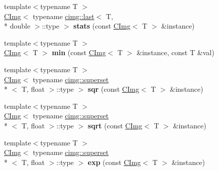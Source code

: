 \begin{DoxyCompactItemize}
\item 
\hypertarget{namespacecimg__library_a65ae500e6c92b0801d4dd80b67e54506}{{\footnotesize template$<$typename T $>$ }\\\hyperlink{structcimg__library_1_1_c_img}{C\-Img}$<$ typename \hyperlink{structcimg__library_1_1cimg_1_1last}{cimg\-::last}$<$ T, \\*
double $>$\-::type $>$ {\bfseries stats} (const \hyperlink{structcimg__library_1_1_c_img}{C\-Img}$<$ T $>$ \&instance)}\label{namespacecimg__library_a65ae500e6c92b0801d4dd80b67e54506}

\item 
\hypertarget{namespacecimg__library_a973eba583e34a30fcf9e64dcf905bcab}{{\footnotesize template$<$typename T $>$ }\\\hyperlink{structcimg__library_1_1_c_img}{C\-Img}$<$ T $>$ {\bfseries min} (const \hyperlink{structcimg__library_1_1_c_img}{C\-Img}$<$ T $>$ \&instance, const T \&val)}\label{namespacecimg__library_a973eba583e34a30fcf9e64dcf905bcab}

\item 
\hypertarget{namespacecimg__library_a1ee7db316304a174dc5390ca6ab98de3}{{\footnotesize template$<$typename T $>$ }\\\hyperlink{structcimg__library_1_1_c_img}{C\-Img}$<$ typename \hyperlink{structcimg__library_1_1cimg_1_1superset}{cimg\-::superset}\\*
$<$ T, float $>$\-::type $>$ {\bfseries sqr} (const \hyperlink{structcimg__library_1_1_c_img}{C\-Img}$<$ T $>$ \&instance)}\label{namespacecimg__library_a1ee7db316304a174dc5390ca6ab98de3}

\item 
\hypertarget{namespacecimg__library_afeb5d929372bfdc3b00309c7bb4f08b1}{{\footnotesize template$<$typename T $>$ }\\\hyperlink{structcimg__library_1_1_c_img}{C\-Img}$<$ typename \hyperlink{structcimg__library_1_1cimg_1_1superset}{cimg\-::superset}\\*
$<$ T, float $>$\-::type $>$ {\bfseries sqrt} (const \hyperlink{structcimg__library_1_1_c_img}{C\-Img}$<$ T $>$ \&instance)}\label{namespacecimg__library_afeb5d929372bfdc3b00309c7bb4f08b1}

\item 
\hypertarget{namespacecimg__library_a8ef3748e0a7eb60fca76e74abd217395}{{\footnotesize template$<$typename T $>$ }\\\hyperlink{structcimg__library_1_1_c_img}{C\-Img}$<$ typename \hyperlink{structcimg__library_1_1cimg_1_1superset}{cimg\-::superset}\\*
$<$ T, float $>$\-::type $>$ {\bfseries exp} (const \hyperlink{structcimg__library_1_1_c_img}{C\-Img}$<$ T $>$ \&instance)}\label{namespacecimg__library_a8ef3748e0a7eb60fca76e74abd217395}


\end{DoxyCompactItemize}
